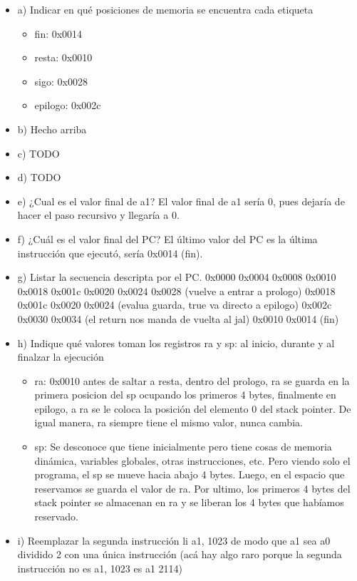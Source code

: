 \documentclass[10pt,a4paper]{article}
\begin{document}
\begin{itemize}
    \item a) Indicar en qué posiciones de memoria se encuentra cada etiqueta
    \begin{itemize}
        \item fin: 0x0014
        \item resta: 0x0010
        \item sigo: 0x0028
        \item epilogo: 0x002c
    \end{itemize}
    \item b) Hecho arriba 
    \item c) TODO
    \item d) TODO 
    \item e) ¿Cual es el valor final de a1? El valor final de a1 sería 0, pues dejaría de hacer el paso recursivo y llegaría a 0.
    \item f) ¿Cuál es el valor final del PC? El último valor del PC es la última instrucción que ejecutó, sería 0x0014 (fin).
    \item g) Listar la secuencia descripta por el PC. 0x0000 0x0004 0x0008 0x0010 0x0018 0x001c 0x0020 0x0024 0x0028 (vuelve a entrar a prologo) 0x0018 0x001c 0x0020 0x0024 (evalua guarda, true va directo a epilogo) 0x002c 0x0030 0x0034 (el return nos manda de vuelta al jal) 0x0010 0x0014 (fin)
    \item h) Indique qué valores toman los registros ra y sp: al inicio, durante y al finalzar la ejecución
    \begin{itemize}
        \item ra: 0x0010 antes de saltar a resta, dentro del prologo, ra se guarda en la primera posicion del sp ocupando los primeros 4 bytes, finalmente en epilogo, a ra se le coloca la posición del elemento 0 del stack pointer. De igual manera, ra siempre tiene el mismo valor, nunca cambia.
        \item sp: Se desconoce que tiene inicialmente pero tiene cosas de memoria dinámica, variables globales, otras instrucciones, etc. Pero viendo solo el programa, el sp se mueve hacia abajo 4 bytes. Luego, en el espacio que reservamos se guarda el valor de ra. Por ultimo, los primeros 4 bytes del stack pointer se almacenan en ra y se liberan los 4 bytes que habíamos reservado.
    \end{itemize}
    \item i) Reemplazar la segunda instrucción li a1, 1023 de modo que a1 sea a0 dividido 2 con una única instrucción (acá hay algo raro porque la segunda instrucción no es a1, 1023 es a1 2114)
\end{itemize}
\end{document}
